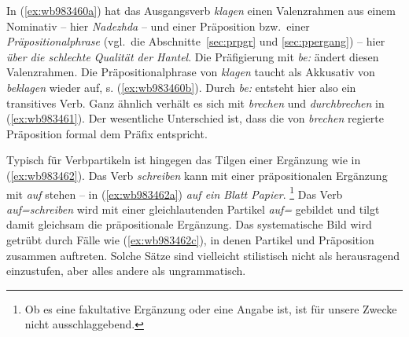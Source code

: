 \begin{exe}
  \ex \label{ex:wb983460}
  \begin{xlist}
  \end{xlist}
  \ex \label{ex:wb983461}
  \begin{xlist}
  \end{xlist}
\end{exe}

In (\ref{ex:wb983460a}) hat das Ausgangsverb \textit{klagen} einen Valenzrahmen aus einem Nominativ -- hier \textit{Nadezhda} -- und einer Präposition bzw.\ einer \textit{Präpositionalphrase} (vgl.\ die Abschnitte~\ref{sec:prpgr} und \ref{sec:ppergang}) -- hier \textit{über die schlechte Qualität der Hantel}.
Die Präfigierung mit \textit{be:} ändert diesen Valenzrahmen.
Die Präpositionalphrase von \textit{klagen} taucht als Akkusativ von \textit{beklagen} wieder auf, s. (\ref{ex:wb983460b}).
Durch \textit{be:} entsteht hier also ein transitives Verb.
Ganz ähnlich verhält es sich mit \textit{brechen} und \textit{durchbrechen} in (\ref{ex:wb983461}).
Der wesentliche Unterschied ist, dass die von \textit{brechen} regierte Präposition formal dem Präfix entspricht.

Typisch für Verbpartikeln ist hingegen das Tilgen einer Ergänzung wie in (\ref{ex:wb983462}). 
Das Verb \textit{schreiben} kann mit einer präpositionalen Ergänzung mit \textit{auf} stehen -- in (\ref{ex:wb983462a}) \textit{auf ein Blatt Papier}.%
\footnote{Ob es eine fakultative Ergänzung oder eine Angabe ist, ist für unsere Zwecke nicht ausschlaggebend.}
Das Verb \textit{auf=schreiben} wird mit einer gleichlautenden Partikel \textit{auf=} gebildet und tilgt damit gleichsam die präpositionale Ergänzung.
Das systematische Bild wird getrübt durch Fälle wie (\ref{ex:wb983462c}), in denen Partikel und Präposition zusammen auftreten.
Solche Sätze sind vielleicht stilistisch nicht als herausragend einzustufen, aber alles andere als ungrammatisch.

\begin{exe}
  \ex \label{ex:wb983462}
  \begin{xlist}
  \end{xlist}
\end{exe}

